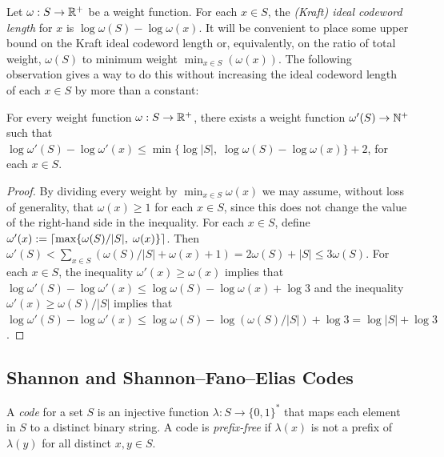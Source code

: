 \documentclass{patmorin}
\renewcommand{\ge}{\geqslant}
\renewcommand{\le}{\leqslant}
\newcommand{\defin}[1]{\emph{\textcolor{brightmaroon}{#1}}}
\DeclarePairedDelimiter{\ceil}{\lceil}{\rceil}
\begin{document}
  Let $\omega:S\to\mathbb{R}^+$ be a weight function.  For each $x\in S$, the \defin{(Kraft) ideal codeword length} for $x$ is $\log\omega(S)-\log\omega(x)$.
  It will be convenient to place some upper bound on the Kraft ideal codeword length or, equivalently, on the ratio of total weight, $\omega(S)$ to minimum weight $\min_{x\in S}(\omega(x))$.  The following observation gives a way to do this without increasing the ideal codeword length of each $x\in S$ by more than a constant:

  \begin{obs}\label{obs:nice}
    For every weight function $\omega:S\to\mathbb{R}^+$, there exists a weight function $\omega'(S)\to\mathbb{N}^+$ such that $\log\omega'(S)-\log\omega'(x)\le\min\{\log|S|,\;\log\omega(S)-\log\omega(x)\}+2$, for each $x\in S$.
  \end{obs}

  \begin{proof}
    By dividing every weight by $\min_{x\in S}\omega(x)$ we may assume, without loss of generality, that $\omega(x)\ge 1$ for each $x\in S$, since this does not change the value of the right-hand side in the inequality.
    For each $x\in S$, define $\omega'(x):=\ceil{\max\{\omega(S)/|S|,\; \omega(x)\}}$.  Then $\omega'(S)<\sum_{x\in S}(\omega(S)/|S|+\omega(x)+1)= 2\omega(S)+|S|\le 3\omega(S)$.  For each $x\in S$, the inequality $\omega'(x)\ge \omega(x)$ implies that $\log\omega'(S)-\log\omega'(x)\le\log \omega(S)-\log\omega(x)+\log 3$ and the inequality $\omega'(x)\ge \omega(S)/|S|$ implies that $\log\omega'(S)-\log\omega'(x)\le \log\omega(S)-\log(\omega(S)/|S|) + \log 3 = \log|S| + \log 3$.
  \end{proof}

  \subsection{Shannon and Shannon--Fano--Elias Codes}

  A \defin{code} for a set $S$ is an injective function $\lambda:S\to\{0,1\}^*$ that maps each element in $S$ to a distinct binary string.  A code is \defin{prefix-free} if $\lambda(x)$ is not a prefix of $\lambda(y)$ for all distinct $x,y\in S$.

\end{document}
